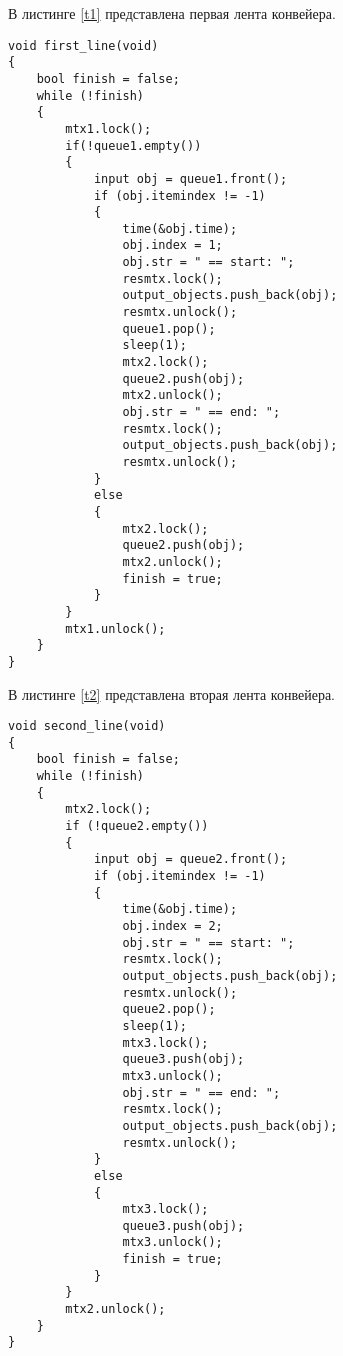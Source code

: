 \documentclass[a4paper, 14pt]{article}
\begin{document}
В листинге \ref{t1} представлена первая лента конвейера.\\

\begin{lstlisting}[label=t1,caption=Вторая лента]
void first_line(void)
{
    bool finish = false;
    while (!finish)
    {
        mtx1.lock();
        if(!queue1.empty())
        {
            input obj = queue1.front();
            if (obj.itemindex != -1)
            {
                time(&obj.time);
                obj.index = 1;
                obj.str = " == start: ";
                resmtx.lock();
                output_objects.push_back(obj);
                resmtx.unlock();
                queue1.pop();
                sleep(1);
                mtx2.lock();
                queue2.push(obj);
                mtx2.unlock();
                obj.str = " == end: ";
                resmtx.lock();
                output_objects.push_back(obj);
                resmtx.unlock();
            }
            else
            {
                mtx2.lock();
                queue2.push(obj);
                mtx2.unlock();
                finish = true;
            }
        }
        mtx1.unlock();
    }
}
\end{lstlisting}

	\newpage
В листинге \ref{t2} представлена вторая лента конвейера.\\

\begin{lstlisting}[label=t2,caption=Вторая лента]
void second_line(void)
{
    bool finish = false;
    while (!finish)
    {
        mtx2.lock();
        if (!queue2.empty())
        {
            input obj = queue2.front();
            if (obj.itemindex != -1)
            {
                time(&obj.time);
                obj.index = 2;
                obj.str = " == start: ";
                resmtx.lock();
                output_objects.push_back(obj);
                resmtx.unlock();
                queue2.pop();
                sleep(1);
                mtx3.lock();
                queue3.push(obj);
                mtx3.unlock();
                obj.str = " == end: ";
                resmtx.lock();
                output_objects.push_back(obj);
                resmtx.unlock();
            }
            else
            {
                mtx3.lock();
                queue3.push(obj);
                mtx3.unlock();
                finish = true;
            }
        }
        mtx2.unlock();
    }
}
\end{lstlisting}
\end{document}
